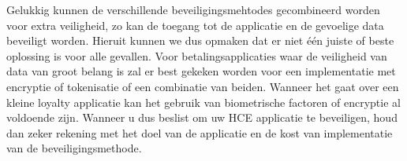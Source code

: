 Gelukkig kunnen de verschillende beveiligingsmehtodes gecombineerd worden voor extra veiligheid, zo kan de toegang tot de applicatie en de gevoelige data beveiligt worden. Hieruit kunnen we dus opmaken dat er niet één juiste of beste oplossing is voor alle gevallen. Voor betalingsapplicaties waar de veiligheid van data van groot belang is zal er best gekeken worden voor een implementatie met encryptie of tokenisatie of een combinatie van beiden. Wanneer het gaat over een kleine loyalty applicatie kan het gebruik van biometrische factoren of encryptie al voldoende zijn. Wanneer u dus beslist om uw HCE applicatie te beveiligen, houd dan zeker rekening met het doel van de applicatie en de kost van implementatie van de beveiligingsmethode.
